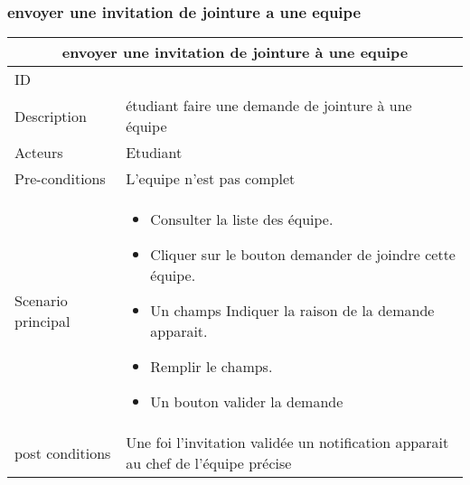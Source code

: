 \documentclass[11pt,fleqn]{book} %
\begin{document}
\subsubsection{envoyer une invitation de jointure a une equipe}
\begin{center}
\begin{tabularx}{1\textwidth} { | p{4cm} | >{\raggedright\arraybackslash}X |  }
  \hline
  \multicolumn{2}{|c|}{envoyer une invitation de jointure à une equipe} \\
 \hline
 ID & 2  \\
 \hline
 Description  &  étudiant faire une demande de jointure à une équipe  \\
  \hline
 Acteurs  & Etudiant   \\
  \hline
 Pre-conditions  & L'equipe n'est pas complet\\
 \hline
 Scenario principal  &  
 \begin{itemize}
     \item Consulter la liste des équipe.
     \item Cliquer sur le bouton demander de joindre cette équipe.
     \item Un champs Indiquer la raison de la demande apparait.
     \item Remplir le champs.
     \item Un bouton valider la demande
 \end{itemize}\\
  \hline
 post conditions  &  Une foi l’invitation validée un notification apparait au chef de l’équipe précise  \\
  \hline
\end{tabularx}
\label{tbl:nicetablelesstable}
\end{center}
\end{document}
